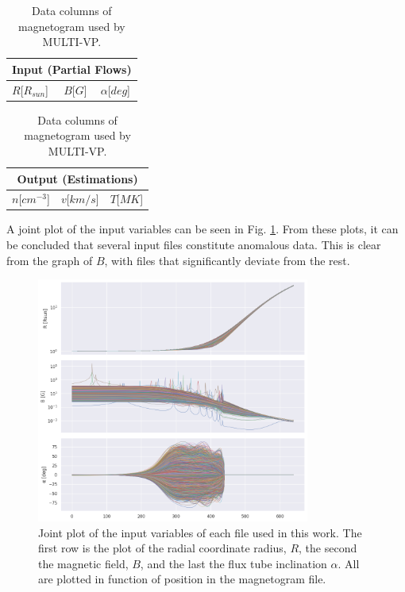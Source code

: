 \begin{table}[ht]
    \caption{Data columns of magnetogram used by MULTI-VP.}
    \label{tab:multivp_columns}
    \begin{subtable}[h]{0.32\textwidth}
        \centering
        \begin{tabular}{lcc}
        \hline
        \multicolumn{3}{c}{Input (Partial Flows)}                              \\ \hline
        $R${[}$R_{sun}${]} & $B${[}$G${]} & $\alpha${[}$deg${]} \\ \hline
        \end{tabular}
    \end{subtable}
    \begin{subtable}[h]{0.32\textwidth}
        \centering
        \begin{tabular}{ccc}
        \hline
        \multicolumn{3}{c}{Output (Estimations)}                           \\ \hline
        $n${[}$cm^{-3}${]} & $v${[}$km/s${]} & $T${[}$MK${]} \\ \hline
        \end{tabular}
    \end{subtable}
\end{table}

A joint plot of the input variables can be seen in Fig. \ref{fig:jointplot_input}. From these plots, it can be concluded that several input files constitute anomalous data. This is clear from the graph of $B$, with files that significantly deviate from the rest. 


\begin{figure}[h]
    \centering
    \includegraphics[width=0.8\textwidth]{figures/joint_input_cols.png}
    \caption{Joint plot of the input variables of each file used in this work. The first row is the plot of the radial coordinate radius, $R$, the second the magnetic field, $B$, and the last the flux tube inclination $\alpha$. All are plotted in function of position in the magnetogram file.}
    \label{fig:jointplot_input}
\end{figure}

